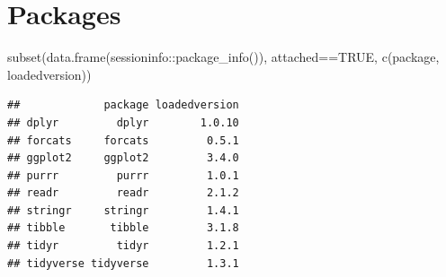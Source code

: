 \documentclass[
]{book}
\newenvironment{Shaded}{\begin{snugshade}}{\end{snugshade}}
\newcommand{\ConstantTok}[1]{\textcolor[rgb]{0.00,0.00,0.00}{#1}}
\newcommand{\FunctionTok}[1]{\textcolor[rgb]{0.00,0.00,0.00}{#1}}
\newcommand{\NormalTok}[1]{#1}
\newcommand{\SpecialCharTok}[1]{\textcolor[rgb]{0.00,0.00,0.00}{#1}}
\begin{document}
\hypertarget{packages-1}{%
\section*{Packages}\label{packages-1}}

\begin{Shaded}
\begin{Highlighting}[]
\FunctionTok{subset}\NormalTok{(}\FunctionTok{data.frame}\NormalTok{(sessioninfo}\SpecialCharTok{::}\FunctionTok{package\_info}\NormalTok{()), attached}\SpecialCharTok{==}\ConstantTok{TRUE}\NormalTok{, }\FunctionTok{c}\NormalTok{(package, loadedversion))}
\end{Highlighting}
\end{Shaded}

\begin{verbatim}
##             package loadedversion
## dplyr         dplyr        1.0.10
## forcats     forcats         0.5.1
## ggplot2     ggplot2         3.4.0
## purrr         purrr         1.0.1
## readr         readr         2.1.2
## stringr     stringr         1.4.1
## tibble       tibble         3.1.8
## tidyr         tidyr         1.2.1
## tidyverse tidyverse         1.3.1
\end{verbatim}

  
\end{document}
